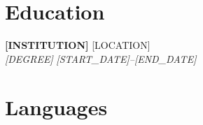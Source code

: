 \documentclass[10.5pt,a4paper]{article}
\newcommand{\cvheaderline}[2]{\textbf{#1} \hfill #2\\}
\newcommand{\cvsubheaderline}[2]{\textit{#1} \hfill \textit{#2}\\[1pt]}
\begin{document}
\section{Education}
\cvheaderline{[INSTITUTION]}{[LOCATION]}
\cvsubheaderline{[DEGREE]}{[START_DATE]--[END_DATE]}

\section{Languages}
\end{document}

